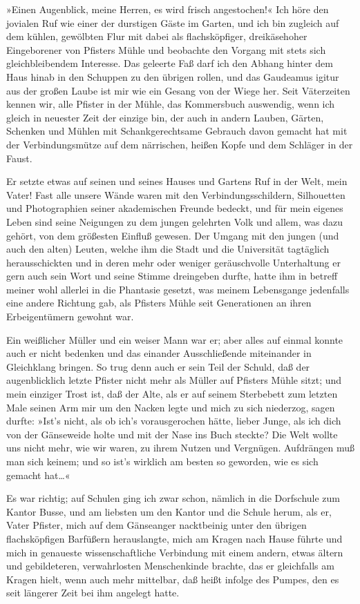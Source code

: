 »Einen Augenblick, meine Herren, es wird frisch angestochen!« Ich
höre den jovialen Ruf wie einer der durstigen Gäste im Garten, und
ich bin zugleich auf dem kühlen, gewölbten Flur mit dabei als
flachsköpfiger, dreikäsehoher Eingeborener von Pfisters Mühle und
beobachte den Vorgang mit stets sich gleichbleibendem Interesse.
Das geleerte Faß darf ich den Abhang hinter dem Haus hinab in den
Schuppen zu den übrigen rollen, und das Gaudeamus igitur aus der
großen Laube ist mir wie ein Gesang von der Wiege her. Seit
Väterzeiten kennen wir, alle Pfister in der Mühle, das Kommersbuch
auswendig, wenn ich gleich in neuester Zeit der einzige bin, der
auch in andern Lauben, Gärten, Schenken und Mühlen mit
Schankgerechtsame Gebrauch davon gemacht hat mit der
Verbindungsmütze auf dem närrischen, heißen Kopfe und dem Schläger
in der Faust.

Er setzte etwas auf seinen und seines Hauses und Gartens Ruf in der
Welt, mein Vater! Fast alle unsere Wände waren mit den
Verbindungsschildern, Silhouetten und Photographien seiner
akademischen Freunde bedeckt, und für mein eigenes Leben sind seine
Neigungen zu dem jungen gelehrten Volk und allem, was dazu gehört,
von dem größesten Einfluß gewesen. Der Umgang mit den jungen (und
auch den alten) Leuten, welche ihm die Stadt und die Universität
tagtäglich herausschickten und in deren mehr oder weniger
geräuschvolle Unterhaltung er gern auch sein Wort und seine Stimme
dreingeben durfte, hatte ihm in betreff meiner wohl allerlei in die
Phantasie gesetzt, was meinem Lebensgange jedenfalls eine andere
Richtung gab, als Pfisters Mühle seit Generationen an ihren
Erbeigentümern gewohnt war.

Ein weißlicher Müller und ein weiser Mann war er; aber alles auf
einmal konnte auch er nicht bedenken und das einander
Ausschließende miteinander in Gleichklang bringen. So trug denn
auch er sein Teil der Schuld, daß der augenblicklich letzte Pfister
nicht mehr als Müller auf Pfisters Mühle sitzt; und mein einziger
Trost ist, daß der Alte, als er auf seinem Sterbebett zum letzten
Male seinen Arm mir um den Nacken legte und mich zu sich niederzog,
sagen durfte: »Ist's nicht, als ob ich's vorausgerochen hätte,
lieber Junge, als ich dich von der Gänseweide holte und mit der
Nase ins Buch steckte? Die Welt wollte uns nicht mehr, wie wir
waren, zu ihrem Nutzen und Vergnügen. Aufdrängen muß man sich
keinem; und so ist's wirklich am besten so geworden, wie es sich
gemacht hat\ldots{}«

Es war richtig; auf Schulen ging ich zwar schon, nämlich in die
Dorfschule zum Kantor Busse, und am liebsten um den Kantor und die
Schule herum, als er, Vater Pfister, mich auf dem Gänseanger
nacktbeinig unter den übrigen flachsköpfigen Barfüßern
herauslangte, mich am Kragen nach Hause führte und mich in
genaueste wissenschaftliche Verbindung mit einem andern, etwas
ältern und gebildeteren, verwahrlosten Menschenkinde brachte, das
er gleichfalls am Kragen hielt, wenn auch mehr mittelbar, daß heißt
infolge des Pumpes, den es seit längerer Zeit bei ihm angelegt
hatte.

